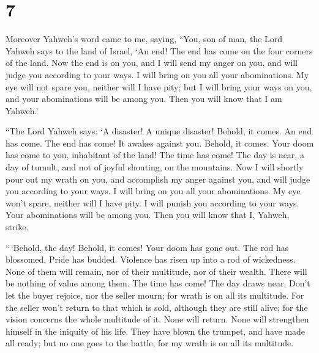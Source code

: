 \hypertarget{section-6}{%
\section{7}\label{section-6}}

 Moreover Yahweh's word came to me, saying, 
``You, son of man, the Lord Yahweh says to the land of Israel, `An end!
The end has come on the four corners of the land.  Now the
end is on you, and I will send my anger on you, and will judge you
according to your ways. I will bring on you all your abominations.
 My eye will not spare you, neither will I have pity; but
I will bring your ways on you, and your abominations will be among you.
Then you will know that I am Yahweh.'

 ``The Lord Yahweh says: `A disaster! A unique disaster!
Behold, it comes.  An end has come. The end has come! It
awakes against you. Behold, it comes.  Your doom has come
to you, inhabitant of the land! The time has come! The day is near, a
day of tumult, and not of joyful shouting, on the mountains.
 Now I will shortly pour out my wrath on you, and
accomplish my anger against you, and will judge you according to your
ways. I will bring on you all your abominations.  My eye
won't spare, neither will I have pity. I will punish you according to
your ways. Your abominations will be among you. Then you will know that
I, Yahweh, strike.

 ``\,`Behold, the day! Behold, it comes! Your doom has
gone out. The rod has blossomed. Pride has budded. 
Violence has risen up into a rod of wickedness. None of them will
remain, nor of their multitude, nor of their wealth. There will be
nothing of value among them.  The time has come! The day
draws near. Don't let the buyer rejoice, nor the seller mourn; for wrath
is on all its multitude.  For the seller won't return to
that which is sold, although they are still alive; for the vision
concerns the whole multitude of it. None will return. None will
strengthen himself in the iniquity of his life.  They
have blown the trumpet, and have made all ready; but no one goes to the
battle, for my wrath is on all its multitude.

